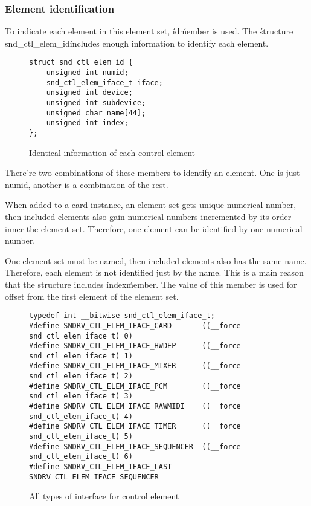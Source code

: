 \documentclass[onecolumn]{article}
\begin{document}
\subsubsection{Element identification}

To indicate each element in this element set, \'id\' member is used. The \'structure snd\_ctl\_elem\_id\' includes enough information to identify each element.

\begin{figure}[htbp]
\small
\begin{verbatim}
struct snd_ctl_elem_id {
    unsigned int numid;
    snd_ctl_elem_iface_t iface;
    unsigned int device;
    unsigned int subdevice;
    unsigned char name[44];
    unsigned int index;
};
\end{verbatim}
\caption{{Identical information of each control element}}
\label{control-element-id}
\end{figure}

There're two combinations of these members to identify an element. One is just numid, another is a combination of the rest.

When added to a card instance, an element set gets unique numerical number, then included elements also gain numerical numbers incremented by its order inner the element set. Therefore, one element can be identified by one numerical number.

One element set must be named, then included elements also has the same name. Therefore, each element is not identified just by the name. This is a main reason that the structure includes \'index\' member. The value of this member is used for offset from the first element of the element set. 

\begin{figure}[htbp]
\small
\begin{verbatim}
typedef int __bitwise snd_ctl_elem_iface_t;
#define SNDRV_CTL_ELEM_IFACE_CARD       ((__force snd_ctl_elem_iface_t) 0)
#define SNDRV_CTL_ELEM_IFACE_HWDEP      ((__force snd_ctl_elem_iface_t) 1)
#define SNDRV_CTL_ELEM_IFACE_MIXER      ((__force snd_ctl_elem_iface_t) 2)
#define SNDRV_CTL_ELEM_IFACE_PCM        ((__force snd_ctl_elem_iface_t) 3)
#define SNDRV_CTL_ELEM_IFACE_RAWMIDI    ((__force snd_ctl_elem_iface_t) 4)
#define SNDRV_CTL_ELEM_IFACE_TIMER      ((__force snd_ctl_elem_iface_t) 5)
#define SNDRV_CTL_ELEM_IFACE_SEQUENCER  ((__force snd_ctl_elem_iface_t) 6)
#define SNDRV_CTL_ELEM_IFACE_LAST       SNDRV_CTL_ELEM_IFACE_SEQUENCER
\end{verbatim}
\caption{{All types of interface for control element}}
\label{element-interface-type}
\end{figure}
\end{document}
